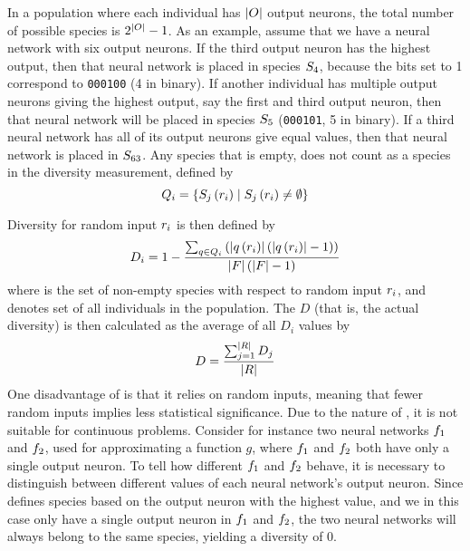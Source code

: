 In a population where each individual has $\lvert O\rvert$ output neurons, the total number of possible species is $2^{\lvert O\rvert} - 1$.  As an example, assume that we have a neural network with six output neurons. If the third output neuron has the highest output, then that neural network is placed in species $S_4$, because the bits set to 1 correspond to \texttt{000100} (4 in binary). If another individual has multiple output neurons giving the highest output, say the first and third output neuron, then that neural network will be placed in species $S_5$ (\texttt{000101}, 5 in binary). If a third neural network has all of its output neurons give equal values, then that neural network is placed in $S_{63}$. Any species that is empty, does not count as a species in the diversity measurement, defined by
\begin{equation*}\label{eq:nonemptyspecies}
  Q_{i} = \left\{ S_{j}\left(r_i\right) \mid S_{j}\left(r_i\right) \neq \emptyset \right\}
\end{equation*}

Diversity for random input $r_i$ is then defined by
%
\begin{equation*}\label{eq:sdi}
  D_i = 1 - \frac{\sum_{q \in Q_{i}}\left(\lvert q\left(r_i\right)\rvert\left(\lvert q\left(r_i\right)\rvert - 1\right)\right)}{\lvert F\rvert\left(\lvert F\rvert - 1\right)}
\end{equation*}
%
where  is the set of non-empty species with respect to random input $r_i$, and \indset{} denotes set of all individuals in the population. The \dia{} $D$ (that is, the actual diversity) is then calculated as the average of all \ransetl{} $D_i$ values by
%
\[
  D =\frac{\sum_{j=1}^{\lvert R\rvert}{D_j}}{\lvert R\rvert}
\]
%
One disadvantage of \dia{} is that it relies on random inputs, meaning that fewer random inputs implies less statistical significance. Due to the nature of \dia, it is not suitable for continuous problems. Consider for instance two neural networks $f_1$ and $f_2$, used for approximating a function $g$, where $f_1$ and $f_2$ both have only a single output neuron. To tell how different $f_1$ and $f_2$ behave, it is necessary to distinguish between different values of each neural network's output neuron. Since \dia{} defines species based on the output neuron with the highest value, and we in this case only have a single output neuron in $f_1$ and $f_2$, the two neural networks will always belong to the same species, yielding a diversity of 0.  
